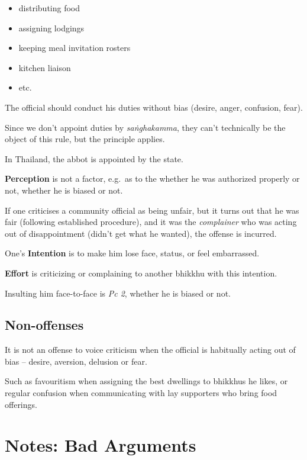 \begin{itemize}
\tightlist
\item
  distributing food
\item
  assigning lodgings
\item
  keeping meal invitation rosters
\item
  kitchen liaison
\item
  etc.
\end{itemize}

The official should conduct his duties without bias (desire, anger,
confusion, fear).

Since we don't appoint duties by \emph{saṅghakamma}, they can't
technically be the object of this rule, but the principle applies.

In Thailand, the abbot is appointed by the state.

\textbf{Perception} is not a factor, e.g.~as to the whether he was
authorized properly or not, whether he is biased or not.

If one criticises a community official as being unfair, but it turns out
that he was fair (following established procedure), and it was the
\emph{complainer} who was acting out of disappointment (didn't get what
he wanted), the offense is incurred.

One's \textbf{Intention} is to make him lose face, status, or feel
embarrassed.

\textbf{Effort} is criticizing or complaining to another bhikkhu with
this intention.

Insulting him face-to-face is \emph{Pc 2}, whether he is biased or not.

\subsection{Non-offenses}

It is not an offense to voice criticism when the official is habitually
acting out of bias -- desire, aversion, delusion or fear.

Such as favouritism when assigning the best dwellings to bhikkhus he
likes, or regular confusion when communicating with lay supporters who
bring food offerings.

\bigskip

\section{Notes: Bad Arguments}

\bigskip

